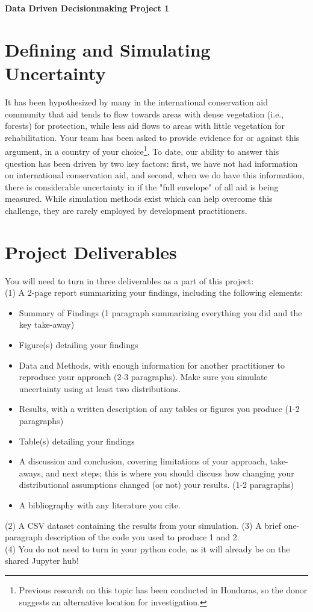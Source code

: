 \documentclass[a4paper, 11pt]{article}
\begin{document}
\noindent
\large\textbf{Data Driven Decisionmaking} \hfill \textbf{Project 1} \\

\section*{Defining and Simulating Uncertainty}
It has been hypothesized by many in the international conservation aid community that aid tends to flow towards areas with dense vegetation (i.e., forests) for protection, while less aid flows to areas with little vegetation for rehabilitation.  Your team has been asked to provide evidence for or against this argument, in a country of your choice\footnote{Previous research on this topic has been conducted in Honduras, so the donor suggests an alternative location for investigation.}.  To date, our ability to answer this question has been driven by two key factors: first, we have not had information on international conservation aid, and second, when we do have this information, there is considerable uncertainty in if the "full envelope" of all aid is being measured.  While simulation methods exist which can help overcome this challenge, they are rarely employed by development practitioners.

\section{Project Deliverables}
You will need to turn in three deliverables as a part of this project:\\
(1) A 2-page report summarizing your findings, including the following elements:
\begin{itemize}
\item Summary of Findings (1 paragraph summarizing everything you did and the key take-away)
\item Figure(s) detailing your findings
\item Data and Methods, with enough information for another practitioner to reproduce your approach (2-3 paragraphs).  Make sure you simulate uncertainty using at least two distributions.
\item Results, with a written description of any tables or figures you produce (1-2 paragraphs)
\item Table(s) detailing your findings
\item A discussion and conclusion, covering limitations of your approach, take-aways, and next steps; this is where you should discuss how changing your distributional assumptions changed (or not) your results. (1-2 paragraphs)
\item A bibliography with any literature you cite.
\end{itemize}
(2) A CSV dataset containing the results from your simulation.
(3) A brief one-paragraph description of the code you used to produce 1 and 2.\\
(4) You do not need to turn in your python code, as it will already be on the shared Jupyter hub!\\
\end{document}
